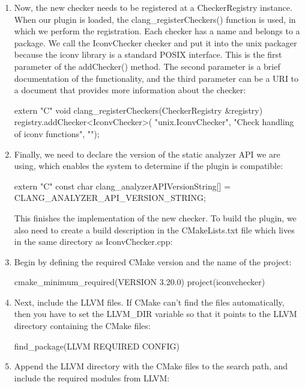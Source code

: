 \begin{enumerate}
\item
Now, the new checker needs to be registered at a CheckerRegistry instance. When our plugin is loaded, the clang\_registerCheckers() function is used, in which we perform the registration. Each checker has a name and belongs to a package. We call the IconvChecker checker and put it into the unix packager because the iconv library is a standard POSIX interface. This is the first parameter of the addChecker() method. The second parameter is a brief documentation of the functionality, and the third parameter can be a URI to a document that provides more information about the checker:

\begin{cpp}
extern "C" void
clang_registerCheckers(CheckerRegistry &registry) {
    registry.addChecker<IconvChecker>(
        "unix.IconvChecker",
        "Check handling of iconv functions", "");
}
\end{cpp}

\item
Finally, we need to declare the version of the static analyzer API we are using, which enables the system to determine if the plugin is compatible:

\begin{cpp}
extern "C" const char clang_analyzerAPIVersionString[] =
    CLANG_ANALYZER_API_VERSION_STRING;
\end{cpp}

This finishes the implementation of the new checker. To build the plugin, we also need to create a build description in the CMakeLists.txt file which lives in the same directory as IconvChecker.cpp:

\item
Begin by defining the required CMake version and the name of the project:

\begin{cmake}
cmake_minimum_required(VERSION 3.20.0)
project(iconvchecker)
\end{cmake}

\item
Next, include the LLVM files. If CMake can’t find the files automatically, then you have to set the LLVM\_DIR variable so that it points to the LLVM directory containing the CMake files:

\begin{cmake}
find_package(LLVM REQUIRED CONFIG)
\end{cmake}

\item
Append the LLVM directory with the CMake files to the search path, and include the required modules from LLVM:


\end{enumerate}
